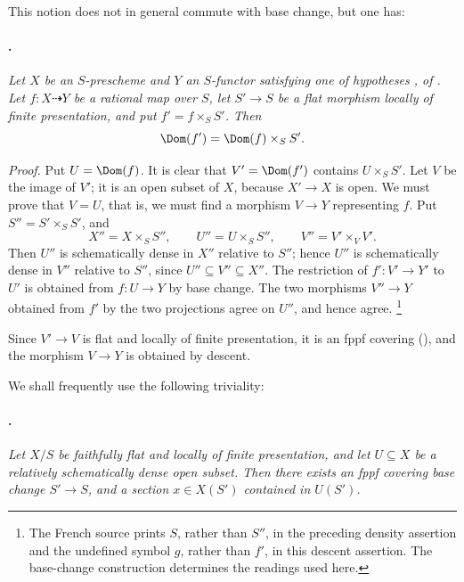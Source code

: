 This notion does not in general commute with base change, but one
has:

\paragraph{.}
\textit{Let \(X\) be an \(S\)-prescheme and \(Y\) an \(S\)-functor
satisfying one of hypotheses ,  of . Let
\(f:X\dashrightarrow Y\) be a rational map over \(S\), let
\(S'\to S\) be a flat morphism locally of finite presentation, and
put \(f'=f\times_S S'\). Then}
\[
  \Dom(f')=\Dom(f)\times_S S'.
\]

\textit{Proof.}
Put \(U=\Dom(f)\). It is clear that \(V'=\Dom(f')\) contains
\(U\times_S S'\). Let \(V\) be the image of \(V'\); it is an open
subset of \(X\), because \(X'\to X\) is open. We must prove that
\(V=U\), that is, we must find a morphism \(V\to Y\) representing
\(f\). Put \(S''=S'\times_S S'\), and
\[
  X''=X\times_S S'',\qquad
  U''=U\times_S S'',\qquad
  V''=V'\times_V V'.
\]
Then \(U''\) is schematically dense in \(X''\) relative to \(S''\);
hence \(U''\) is schematically dense in \(V''\) relative to
\(S''\), since \(U''\subseteq V''\subseteq X''\). The restriction
of \(f':V'\to Y'\) to \(U'\) is obtained from \(f:U\to Y\) by base
change. The two morphisms \(V''\to Y\) obtained from \(f'\) by the
two projections agree on \(U''\), and hence agree.\begingroup
\renewcommand{\thefootnote}{\ensuremath{\dagger}}\footnote{The
French source prints \(S\), rather than \(S''\), in the preceding
density assertion and the undefined symbol \(g\), rather than
\(f'\), in this descent assertion. The base-change construction
determines the readings used here.}
\addtocounter{footnote}{-1}
\endgroup Since \(V'\to V\) is flat and
locally of finite presentation, it is an fppf covering (), and the morphism \(V\to Y\) is obtained by descent.

We shall frequently use the following triviality:

\paragraph{.}
\textit{Let \(X/S\) be faithfully flat and locally of finite
presentation, and let \(U\subseteq X\) be a relatively schematically
dense open subset. Then there exists an fppf covering base change
\(S'\to S\), and a section \(x\in X(S')\) contained in \(U(S')\).}

